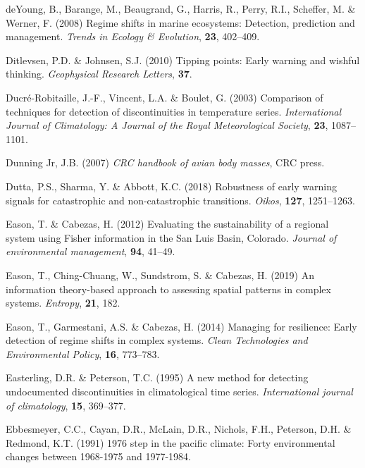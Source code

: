 \documentclass[12pt,twoside,openany]{reedthesis}
\begin{document}
\leavevmode\hypertarget{ref-deyoung_regime_2008}{}%
deYoung, B., Barange, M., Beaugrand, G., Harris, R., Perry, R.I., Scheffer, M. \& Werner, F. (2008) Regime shifts in marine ecosystems: Detection, prediction and management. \emph{Trends in Ecology \& Evolution}, \textbf{23}, 402--409.

\leavevmode\hypertarget{ref-ditlevsen2010tipping}{}%
Ditlevsen, P.D. \& Johnsen, S.J. (2010) Tipping points: Early warning and wishful thinking. \emph{Geophysical Research Letters}, \textbf{37}.

\leavevmode\hypertarget{ref-ducre2003comparison}{}%
Ducré-Robitaille, J.-F., Vincent, L.A. \& Boulet, G. (2003) Comparison of techniques for detection of discontinuities in temperature series. \emph{International Journal of Climatology: A Journal of the Royal Meteorological Society}, \textbf{23}, 1087--1101.

\leavevmode\hypertarget{ref-dunning2007crc}{}%
Dunning Jr, J.B. (2007) \emph{CRC handbook of avian body masses}, CRC press.

\leavevmode\hypertarget{ref-dutta2018robustness}{}%
Dutta, P.S., Sharma, Y. \& Abbott, K.C. (2018) Robustness of early warning signals for catastrophic and non-catastrophic transitions. \emph{Oikos}, \textbf{127}, 1251--1263.

\leavevmode\hypertarget{ref-eason_evaluating_2012}{}%
Eason, T. \& Cabezas, H. (2012) Evaluating the sustainability of a regional system using Fisher information in the San Luis Basin, Colorado. \emph{Journal of environmental management}, \textbf{94}, 41--49.

\leavevmode\hypertarget{ref-eason2019information}{}%
Eason, T., Ching-Chuang, W., Sundstrom, S. \& Cabezas, H. (2019) An information theory-based approach to assessing spatial patterns in complex systems. \emph{Entropy}, \textbf{21}, 182.

\leavevmode\hypertarget{ref-eason2014managing}{}%
Eason, T., Garmestani, A.S. \& Cabezas, H. (2014) Managing for resilience: Early detection of regime shifts in complex systems. \emph{Clean Technologies and Environmental Policy}, \textbf{16}, 773--783.

\leavevmode\hypertarget{ref-easterling1995new}{}%
Easterling, D.R. \& Peterson, T.C. (1995) A new method for detecting undocumented discontinuities in climatological time series. \emph{International journal of climatology}, \textbf{15}, 369--377.

\leavevmode\hypertarget{ref-ebbesmeyer19911976}{}%
Ebbesmeyer, C.C., Cayan, D.R., McLain, D.R., Nichols, F.H., Peterson, D.H. \& Redmond, K.T. (1991) 1976 step in the pacific climate: Forty environmental changes between 1968-1975 and 1977-1984.
\end{document}
